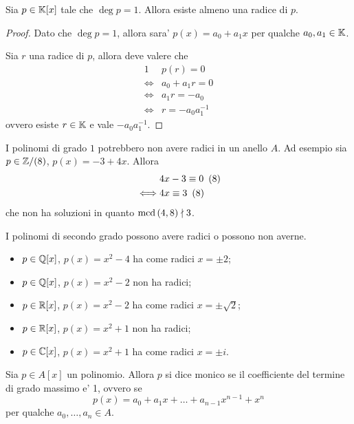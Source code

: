 \begin{proposition}
    Sia $p \in \mathbb{K}[x]$ tale che $\deg p = 1$. Allora esiste almeno una radice di $p$.
\end{proposition}
\begin{proof}
    Dato che $\deg p = 1$, allora sara' $p(x) = a_0 + a_1x$ per qualche $a_0, a_1 \in \mathbb{K}$.

    Sia $r$ una radice di $p$, allora deve valere che \begin{alignat*}
        {1}
        &p(r) = 0 \\
        \iff &a_0 + a_1r = 0 \\
        \iff &a_1r = -a_0 \\
        \iff &r = -a_0a_1^{-1}
    \end{alignat*}
    ovvero esiste $r \in \mathbb{K}$ e vale $-a_0a_1^{-1}$.
\end{proof}

\begin{remark}
    I polinomi di grado $1$ potrebbero non avere radici in un anello $A$. Ad esempio sia $p \in \mathbb{Z}/(8)$, $p(x) = -3 + 4x$. Allora \begin{alignat*}
        {1}
        &4x - 3\equiv 0 \ \left(8\right) \\
        \iff &4x \equiv 3 \ \left(8\right)
    \end{alignat*}
    che non ha soluzioni in quanto $\operatorname{mcd}\left(4, 8\right) \nmid 3$.
\end{remark}

\begin{remark}
    I polinomi di secondo grado possono avere radici o possono non averne.
    \begin{itemize}
        \item $p \in \mathbb{Q}[x]$, $p(x) = x^2 - 4$ ha come radici $x = \pm 2$;
        \item $p \in \mathbb{Q}[x]$, $p(x) = x^2 - 2$ non ha radici;
        \item $p \in \mathbb{R}[x]$, $p(x) = x^2 - 2$ ha come radici $x = \pm \sqrt{2}$;
        \item $p \in \mathbb{R}[x]$, $p(x) = x^2 + 1$ non ha radici;        \item $p \in \mathbb{C}[x]$, $p(x) = x^2 + 1$ ha come radici $x = \pm i$.
    \end{itemize}
\end{remark}

\begin{definition}
    Sia $p \in A[x]$ un polinomio. Allora $p$ si dice monico se il coefficiente del termine di grado massimo e' 1, ovvero se \[
        p(x) = a_0 + a_1x + \dots + a_{n-1}x^{n-1} + x^n    
    \] per qualche $a_0, \dots, a_n \in A$.
\end{definition}


